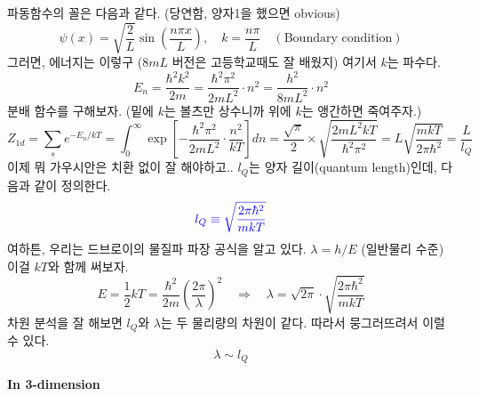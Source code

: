 \documentclass{article}
\begin{document}
파동함수의 꼴은 다음과 같다. (당연함, 양자1을 했으면 obvious)
\begin{equation}
	\psi(x) = \sqrt{\frac{2}{L}} \sin \left( \frac{n\pi x}{L} \right), \quad k = \frac{n \pi}{L} \quad (\text{Boundary condition})
\end{equation}
그러면, 에너지는 이렇구 ($8mL$ 버전은 고등학교때도 잘 배웠지) 여기서 $k$는 파수다.
\begin{equation}
	E_n = \frac{\hbar^2 k^2}{2m} = \frac{\hbar^2 \pi^2}{2mL^2} \cdot n^2 = \frac{h^2}{8mL^2} \cdot n^2
\end{equation}
분배 함수를 구해보자. (밑에 $k$는 볼츠만 상수니까 위에 $k$는 앵간하면 죽여주자.)
\begin{equation}
	Z_{1d} =  \sum_s e^{- E_n / kT} = \int_0^\infty \exp \left[ -\frac{\hbar^2 \pi^2}{2mL^2} \cdot \frac{n^2}{kT} \right] dn = \frac{\sqrt{\pi}}{2} \times \sqrt{\frac{2mL^2 kT}{\hbar^2 \pi^2}} = L \sqrt{\frac{mkT}{2\pi \hbar^2}} = \frac{L}{l_Q}
\end{equation}
이제 뭐 가우시안은 치환 없이 잘 해야하고.. $l_Q$는 양자 길이(quantum length)인데, 다음과 같이 정의한다.
\begin{equation}
\color{blue} l_Q \equiv \sqrt{\frac{2\pi \hbar^2}{mkT}} \color{black}
\end{equation}
여하튼, 우리는 드브로이의 물질파 파장 공식을 알고 있다. $\lambda = h / E$ (일반물리 수준) 이걸 $kT$와 함께 써보자.
\begin{equation}
    E = \frac{1}{2}kT = \frac{\hbar^2}{2m} \left( \frac{2\pi}{\lambda} \right)^2  \quad \Rightarrow \quad \lambda = \sqrt{2\pi} \cdot \sqrt{\frac{2\pi \hbar^2}{mkT}}
\end{equation}
차원 분석을 잘 해보면 $l_Q$와 $\lambda$는 두 물리량의 차원이 같다. 따라서 뭉그러뜨려서 이럴 수 있다.
\begin{equation}
    \lambda \sim l_Q
\end{equation}

\newpage

\noindent
\textbf{In 3-dimension}
\end{document}
